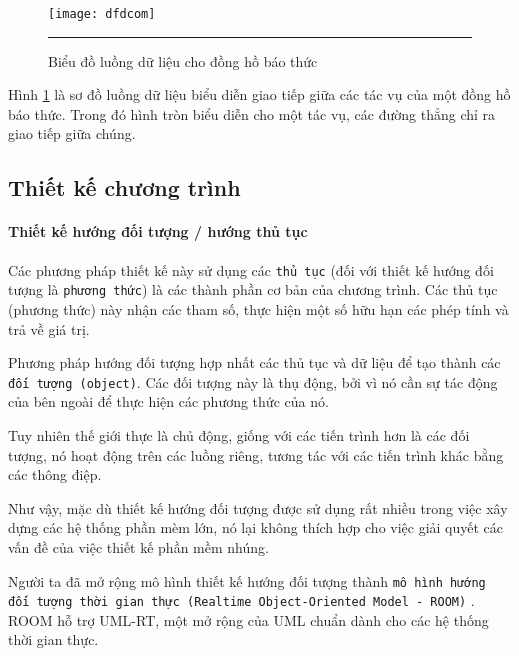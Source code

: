                 \begin{figure}[H]
                    \centering
                    \texttt{[image: dfdcom]}
                    \rule{35em}{0.5pt}
                    \caption{Biểu đồ luồng dữ liệu cho đồng hồ báo thức}
                    \label{fig:dfdcom}
                \end{figure}

                Hình \ref{fig:dfdcom} là sơ đồ luồng dữ liệu biểu diễn giao
                tiếp giữa các tác vụ của một đồng hồ báo thức. Trong đó hình
                tròn biểu diễn cho một tác vụ, các đường thẳng chỉ ra giao tiếp
                giữa chúng.


        \subsection{Thiết kế chương trình}
            \paragraph{Thiết kế hướng đối tượng / hướng thủ tục}
                Các phương pháp thiết kế này sử dụng các \texttt{thủ tục} (đối với
                thiết kế hướng đối tượng là \texttt{phương thức}) là các thành
                phần cơ bản của chương trình. Các thủ tục (phương thức) này
                nhận các tham số, thực hiện một số hữu hạn các phép tính và trả
                về giá trị.

                Phương pháp hướng đối tượng hợp nhất các thủ tục và dữ liệu để
                tạo thành các \texttt{đối tượng (object)}. Các đối tượng này là
                thụ động, bởi vì nó cần sự tác động của bên ngoài để thực hiện
                các phương thức của nó.

                Tuy nhiên thế giới thực là chủ động, giống với các tiến trình
                hơn là các đối tượng, nó hoạt động trên các luồng riêng, tương
                tác với các tiến trình khác bằng các thông điệp. 

                Như vậy, mặc dù thiết kế hướng đối tượng được sử dụng rất nhiều
                trong việc xây dựng các hệ thống phần mèm lớn, nó lại không
                thích hợp cho việc giải quyết các vấn đề của việc thiết kế phần
                mềm nhúng.

                Người ta đã mở rộng mô hình thiết kế hướng đối tượng thành \texttt{mô
                hình hướng đối tượng thời gian thực (Realtime Object-Oriented
                Model - ROOM)} \cite{ROOM}. ROOM hỗ trợ UML-RT, một mở rộng của
                UML chuẩn dành cho các hệ thống thời gian thực. 

